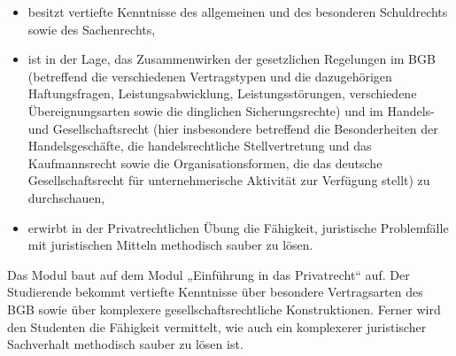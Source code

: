\begin{module}
\begin{learningoutcomes}
 \begin{itemize}\item besitzt vertiefte Kenntnisse des allgemeinen und des besonderen Schuldrechts sowie des Sachenrechts,  \item ist in der Lage, das Zusammenwirken der gesetzlichen Regelungen im BGB (betreffend die verschiedenen Vertragstypen und die dazugehörigen Haftungsfragen, Leistungsabwicklung, Leistungsstörungen, verschiedene Übereignungsarten sowie die dinglichen Sicherungsrechte) und im Handels- und Gesellschaftsrecht (hier insbesondere betreffend die Besonderheiten der Handelsgeschäfte, die handelsrechtliche Stellvertretung und das Kaufmannsrecht sowie die Organisationsformen, die das deutsche Gesellschaftsrecht für unternehmerische Aktivität zur Verfügung stellt) zu durchschauen,  \item erwirbt in der Privatrechtlichen Übung die Fähigkeit, juristische Problemfälle mit juristischen Mitteln methodisch sauber zu lösen.   \end{itemize}
\end{learningoutcomes}

\begin{content}
Das Modul baut auf dem Modul „Einführung in das Privatrecht“ auf. Der Studierende bekommt vertiefte Kenntnisse über besondere Vertragsarten des BGB sowie über komplexere gesellschaftsrechtliche Konstruktionen. Ferner wird den Studenten die Fähigkeit vermittelt, wie auch ein komplexerer juristischer Sachverhalt methodisch sauber zu lösen ist.


\end{content}



\end{module}

